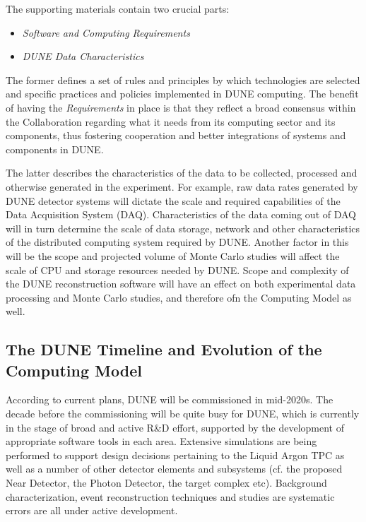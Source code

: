 The supporting materials contain two crucial parts:
\begin{itemize}
\item \textit{Software and Computing Requirements}
\item \textit{DUNE Data Characteristics}
\end{itemize}

The former defines a set of rules and principles by which technologies are selected and specific practices and policies implemented in DUNE computing.
The benefit of having the \textit{Requirements} in place is that they reflect a broad consensus within the Collaboration regarding what it needs from
its computing sector and its components, thus fostering cooperation and better integrations of systems and components in DUNE.

The latter describes the characteristics of the data to be collected, processed and otherwise generated in the experiment.
For example, raw data rates generated by DUNE detector systems will dictate the scale and required capabilities of the Data
Acquisition System (DAQ).  Characteristics of the data coming out of DAQ will in turn determine the scale of data storage, network
and other characteristics of the distributed computing system required by DUNE. Another factor in this will be the scope and projected
volume of Monte Carlo studies  will affect the scale of CPU and storage resources needed by DUNE.  Scope and complexity of the DUNE
reconstruction software will have an effect on both experimental data processing and Monte Carlo studies, and therefore ofn the
Computing Model as well.



\subsection{The DUNE Timeline and Evolution of the Computing Model}
According to current plans, DUNE will be commissioned in mid-2020s. The decade before the commissioning will be quite busy
for DUNE, which is currently in the stage of broad and active R\&D effort, supported by the development of appropriate 
software tools in each area. Extensive simulations are being performed to support design decisions pertaining to the Liquid 
Argon TPC as well as a number of other detector elements and subsystems (cf. the proposed Near Detector, the Photon Detector, 
the target complex etc). Background characterization, event reconstruction techniques and studies are systematic errors are all under active development.

